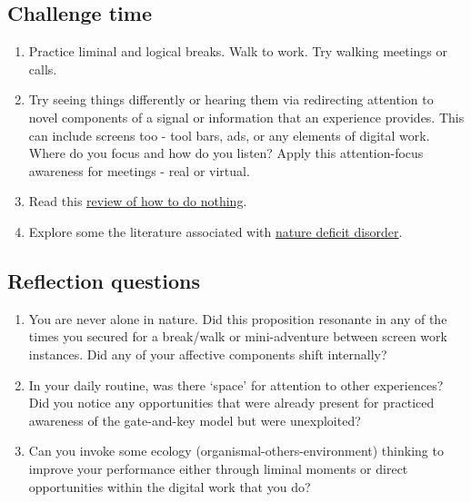 \documentclass[
]{book}
\providecommand{\tightlist}{%
  \setlength{\itemsep}{0pt}\setlength{\parskip}{0pt}}
\begin{document}
\hypertarget{challenge-time-2}{%
\subsection*{Challenge time}\label{challenge-time-2}}

\begin{enumerate}
\def\labelenumi{\arabic{enumi}.}
\tightlist
\item
  Practice liminal and logical breaks. Walk to work. Try walking meetings or calls.
\item
  Try seeing things differently or hearing them via redirecting attention to novel components of a signal or information that an experience provides. This can include screens too - tool bars, ads, or any elements of digital work. Where do you focus and how do you listen? Apply this attention-focus awareness for meetings - real or virtual.\\
\item
  Read this \href{https://www.nytimes.com/2019/04/30/books/review/jenny-odell-how-to-do-nothing.html}{review of how to do nothing}.\\
\item
  Explore some the literature associated with \href{https://en.wikipedia.org/wiki/Nature_deficit_disorder}{nature deficit disorder}.
\end{enumerate}

\hypertarget{reflection-questions-2}{%
\subsection*{Reflection questions}\label{reflection-questions-2}}

\begin{enumerate}
\def\labelenumi{\arabic{enumi}.}
\tightlist
\item
  You are never alone in nature. Did this proposition resonante in any of the times you secured for a break/walk or mini-adventure between screen work instances. Did any of your affective components shift internally?\\
\item
  In your daily routine, was there `space' for attention to other experiences? Did you notice any opportunities that were already present for practiced awareness of the gate-and-key model but were unexploited?\\
\item
  Can you invoke some ecology (organismal-others-environment) thinking to improve your performance either through liminal moments or direct opportunities within the digital work that you do?
\end{enumerate}

  
\end{document}

